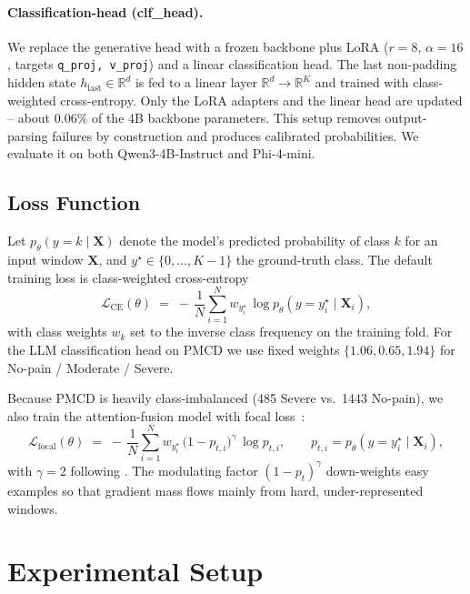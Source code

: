 \documentclass{article}
\begin{document}
\paragraph{Classification-head (clf\_head).} We replace the generative head with a frozen backbone plus LoRA ($r{=}8$, $\alpha{=}16$, targets \texttt{q\_proj, v\_proj}) and a linear classification head. The last non-padding hidden state $h_{\text{last}}\in\mathbb{R}^{d}$ is fed to a linear layer $\mathbb{R}^{d}\to\mathbb{R}^{K}$ and trained with class-weighted cross-entropy. Only the LoRA adapters and the linear head are updated -- about $0.06\%$ of the 4B backbone parameters. This setup removes output-parsing failures by construction and produces calibrated probabilities. We evaluate it on both Qwen3-4B-Instruct and Phi-4-mini.

\subsection{Loss Function}

Let $p_{\theta}(y=k \mid \mathbf{X})$ denote the model's predicted probability of class $k$ for an input window $\mathbf{X}$, and $y^\star \in \{0,\dots,K{-}1\}$ the ground-truth class. The default training loss is class-weighted cross-entropy
\begin{equation}
    \mathcal{L}_{\text{CE}}(\theta) \;=\; -\,\frac{1}{N}\sum_{i=1}^{N} w_{y_i^\star}\,\log p_{\theta}\!\left(y = y_i^\star \mid \mathbf{X}_i\right),
\end{equation}
with class weights $w_k$ set to the inverse class frequency on the training fold. For the LLM classification head on PMCD we use fixed weights $\{1.06, 0.65, 1.94\}$ for No-pain / Moderate / Severe.

Because PMCD is heavily class-imbalanced (485 Severe vs.\ 1443 No-pain), we also train the attention-fusion model with focal loss~\citep{lin2017focal}:
\begin{equation}
    \mathcal{L}_{\text{focal}}(\theta) \;=\; -\,\frac{1}{N}\sum_{i=1}^{N} w_{y_i^\star}\,\bigl(1 - p_{t,i}\bigr)^{\gamma}\,\log p_{t,i},
    \qquad p_{t,i} = p_{\theta}\!\left(y = y_i^\star \mid \mathbf{X}_i\right),
\end{equation}
with $\gamma = 2$ following \citet{lin2017focal}. The modulating factor $(1-p_t)^{\gamma}$ down-weights easy examples so that gradient mass flows mainly from hard, under-represented windows.

\section{Experimental Setup}
\label{sec:baselines}
\end{document}
